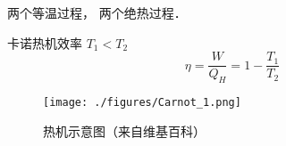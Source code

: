 
两个等温过程， 两个绝热过程．

卡诺热机效率 $T_1 < T_2$
\begin{equation}
\eta = \frac{W}{Q_H} = 1 - \frac{T_1}{T_2}
\end{equation}

\begin{figure}[ht]
\centering
\texttt{[image: ./figures/Carnot\_1.png]}
\caption{热机示意图（来自维基百科）} \label{Carnot_fig1}
\end{figure}

